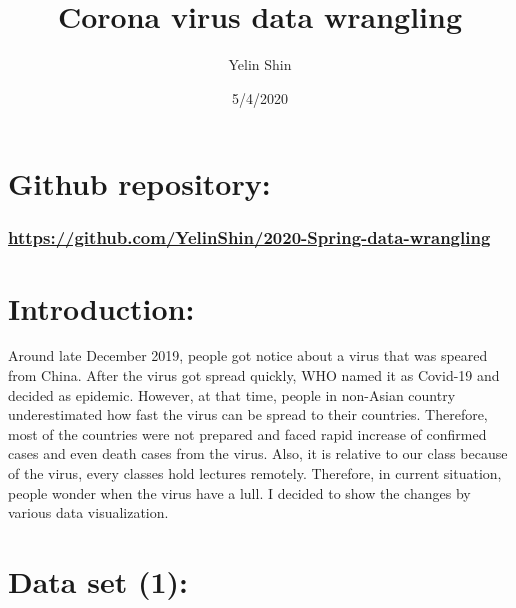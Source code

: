 \documentclass[
  11pt,
]{article}
\title{Corona virus data wrangling}
\author{Yelin Shin}
\date{5/4/2020}
\begin{document}
\maketitle

\hypertarget{github-repository}{%
\section{Github repository:}\label{github-repository}}

\hypertarget{httpsgithub.comyelinshin2020-spring-data-wrangling}{%
\subsubsection{\texorpdfstring{\url{https://github.com/YelinShin/2020-Spring-data-wrangling}}{https://github.com/YelinShin/2020-Spring-data-wrangling}}\label{httpsgithub.comyelinshin2020-spring-data-wrangling}}

\hypertarget{introduction}{%
\section{Introduction:}\label{introduction}}

Around late December 2019, people got notice about a virus that was
speared from China. After the virus got spread quickly, WHO named it as
Covid-19 and decided as epidemic. However, at that time, people in
non-Asian country underestimated how fast the virus can be spread to
their countries. Therefore, most of the countries were not prepared and
faced rapid increase of confirmed cases and even death cases from the
virus. Also, it is relative to our class because of the virus, every
classes hold lectures remotely. Therefore, in current situation, people
wonder when the virus have a lull. I decided to show the changes by
various data visualization.

\hypertarget{data-set-1}{%
\section{Data set (1):}\label{data-set-1}}
\end{document}
